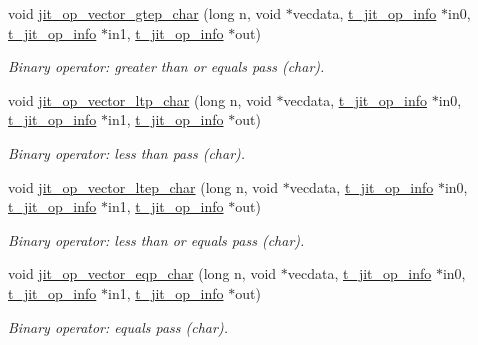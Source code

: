 \begin{DoxyCompactItemize}
void \hyperlink{group__opvecmod_ga2cf7bbc7506303fbe7b33fb6325ba5be}{jit\_\-op\_\-vector\_\-gtep\_\-char} (long n, void $\ast$vecdata, \hyperlink{structt__jit__op__info}{t\_\-jit\_\-op\_\-info} $\ast$in0, \hyperlink{structt__jit__op__info}{t\_\-jit\_\-op\_\-info} $\ast$in1, \hyperlink{structt__jit__op__info}{t\_\-jit\_\-op\_\-info} $\ast$out)
\begin{DoxyCompactList}\small\item\em Binary operator: greater than or equals pass (char). \item\end{DoxyCompactList}\item 
void \hyperlink{group__opvecmod_ga5bff93b6a9da2d5de668c7edd111fffa}{jit\_\-op\_\-vector\_\-ltp\_\-char} (long n, void $\ast$vecdata, \hyperlink{structt__jit__op__info}{t\_\-jit\_\-op\_\-info} $\ast$in0, \hyperlink{structt__jit__op__info}{t\_\-jit\_\-op\_\-info} $\ast$in1, \hyperlink{structt__jit__op__info}{t\_\-jit\_\-op\_\-info} $\ast$out)
\begin{DoxyCompactList}\small\item\em Binary operator: less than pass (char). \item\end{DoxyCompactList}\item 
void \hyperlink{group__opvecmod_ga718042764418c7fd79c70105564c8eb6}{jit\_\-op\_\-vector\_\-ltep\_\-char} (long n, void $\ast$vecdata, \hyperlink{structt__jit__op__info}{t\_\-jit\_\-op\_\-info} $\ast$in0, \hyperlink{structt__jit__op__info}{t\_\-jit\_\-op\_\-info} $\ast$in1, \hyperlink{structt__jit__op__info}{t\_\-jit\_\-op\_\-info} $\ast$out)
\begin{DoxyCompactList}\small\item\em Binary operator: less than or equals pass (char). \item\end{DoxyCompactList}\item 
void \hyperlink{group__opvecmod_ga468e2155800862b807f3d5c6c506d9e8}{jit\_\-op\_\-vector\_\-eqp\_\-char} (long n, void $\ast$vecdata, \hyperlink{structt__jit__op__info}{t\_\-jit\_\-op\_\-info} $\ast$in0, \hyperlink{structt__jit__op__info}{t\_\-jit\_\-op\_\-info} $\ast$in1, \hyperlink{structt__jit__op__info}{t\_\-jit\_\-op\_\-info} $\ast$out)
\begin{DoxyCompactList}\small\item\em Binary operator: equals pass (char). \item\end{DoxyCompactList}\item 

\end{DoxyCompactItemize}
